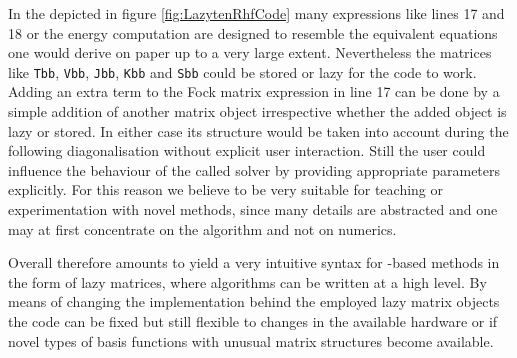 In the \SCF depicted in figure \ref{fig:LazytenRhfCode}
many expressions like lines 17 and 18 or the energy computation
are designed to resemble the equivalent equations one would derive on paper
up to a very large extent.
Nevertheless the matrices like
\texttt{Tbb}, \texttt{Vbb}, \texttt{Jbb}, \texttt{Kbb} and \texttt{Sbb}
could be stored or lazy for the code to work.
Adding an extra term to the Fock matrix expression in line 17 can be done by a simple
addition of another matrix object
irrespective whether the added object is lazy or stored.
In either case its structure would be taken into account
during the following diagonalisation
without explicit user interaction.
Still the user could influence the behaviour of the called solver
by providing appropriate parameters explicitly.
For this reason we believe \lazyten to be very suitable for teaching
or experimentation with novel methods,
since many details are abstracted and one may at first concentrate
on the algorithm and not on numerics.

Overall \lazyten therefore amounts to yield a very intuitive syntax
for \contraction-based methods in the form of lazy matrices,
where algorithms can be written at a high level.
By means of changing the implementation behind the
employed lazy matrix objects the code can be fixed but still flexible
to changes in the available hardware or
if novel types of basis functions with unusual matrix structures
become available.
